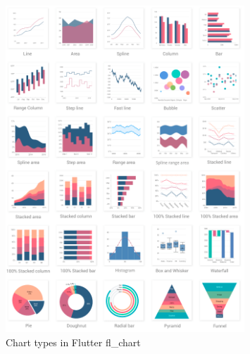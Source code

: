 \begin{figure}[htbp]
      \centering
      \includegraphics[width=0.8\textwidth]{Figures/Charts.png}
      \caption{Chart types in Flutter fl\_chart}
      \label{fig:charts}
\end{figure}

